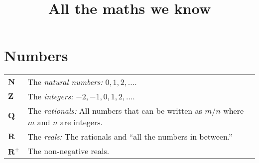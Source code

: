\documentclass[10pt, a4paper, twocolumn]{article}
\title{All the maths we know}
\date{}
\author{}
\newcommand{\set}[1]{\mathbold{#1}}
\begin{document}
\maketitle
\section{Numbers}
\begin{tabularx}{\columnwidth}{@{}p{}>{\raggedright\arraybackslash}X@{}}
  \toprule
  $\set{N}$ & The \emph{natural numbers:} $0, 1, 2, \dotsc$. \\
  $\set{Z}$ & The \emph{integers:} $-2, -1, 0, 1, 2, \dotsc$. \\
  $\set{Q}$ & The \emph{rationals:} All numbers that can be written
  as $m/n$ where $m$ and $n$ are integers. \\
  $\set{R}$ & The \emph{reals:} The rationals and ``all the numbers in
  between.'' \\
  $\set{R}^+$ & The non-negative reals. \\
\end{tabularx}
\end{document}

